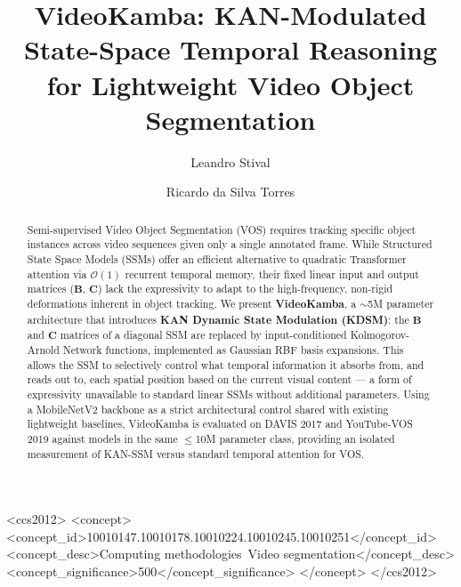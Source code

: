 \documentclass[sigconf]{acmart}
\begin{document}
\title{VideoKamba: KAN-Modulated State-Space Temporal Reasoning for Lightweight Video Object Segmentation}

\author{Leandro Stival}

\author{Ricardo da Silva Torres}

\renewcommand{\shortauthors}{Stival and Torres}

\begin{abstract}
Semi-supervised Video Object Segmentation (VOS) requires tracking specific object instances across video sequences given only a single annotated frame. While Structured State Space Models (SSMs) offer an efficient alternative to quadratic Transformer attention via $\mathcal{O}(1)$ recurrent temporal memory, their fixed linear input and output matrices ($\mathbf{B}$, $\mathbf{C}$) lack the expressivity to adapt to the high-frequency, non-rigid deformations inherent in object tracking. We present \textbf{VideoKamba}, a $\sim$5M parameter architecture that introduces \textbf{KAN Dynamic State Modulation (KDSM)}: the $\mathbf{B}$ and $\mathbf{C}$ matrices of a diagonal SSM are replaced by input-conditioned Kolmogorov-Arnold Network functions, implemented as Gaussian RBF basis expansions. This allows the SSM to selectively control what temporal information it absorbs from, and reads out to, each spatial position based on the current visual content — a form of expressivity unavailable to standard linear SSMs without additional parameters. Using a MobileNetV2 backbone as a strict architectural control shared with existing lightweight baselines, VideoKamba is evaluated on DAVIS 2017 and YouTube-VOS 2019 against models in the same $\leq$10M parameter class, providing an isolated measurement of KAN-SSM versus standard temporal attention for VOS.
\end{abstract}

\begin{CCSXML}
<ccs2012>
 <concept>
  <concept_id>10010147.10010178.10010224.10010245.10010251</concept_id>
  <concept_desc>Computing methodologies~Video segmentation</concept_desc>
  <concept_significance>500</concept_significance>
 </concept>
</ccs2012>
\end{CCSXML}

\end{document}
